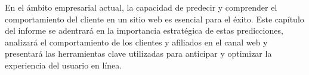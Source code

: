 En el ámbito empresarial actual, la capacidad de predecir y comprender el comportamiento del cliente en un sitio web es esencial para el éxito. Este capítulo del informe se adentrará en la importancia estratégica de estas predicciones, analizará el comportamiento de los clientes y afiliados en el canal web y presentará las herramientas clave utilizadas para anticipar y optimizar la experiencia del usuario en línea.